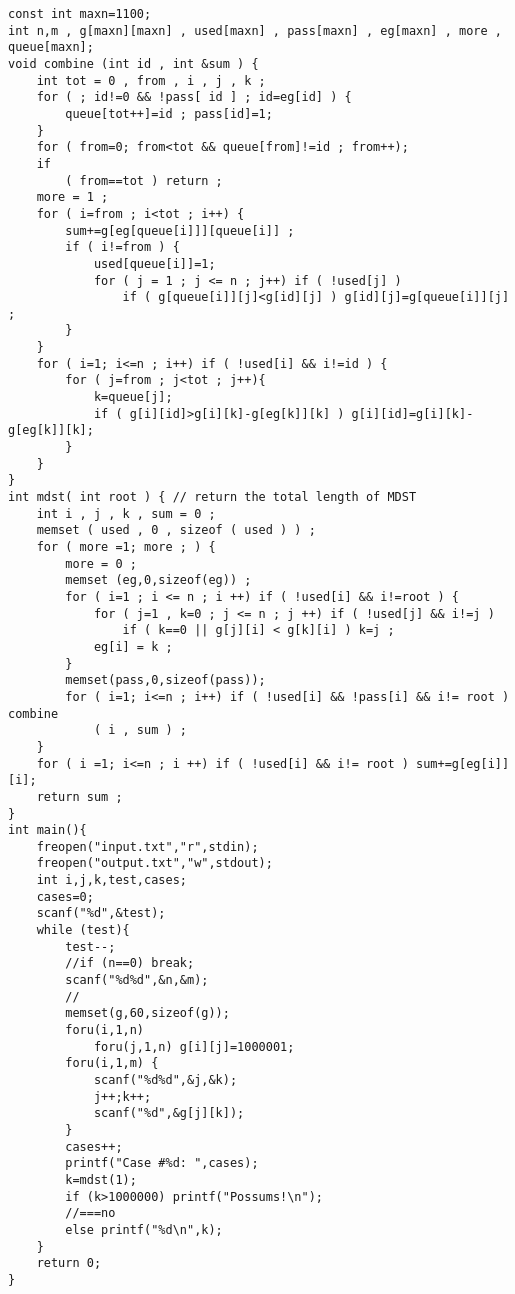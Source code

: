 \begin{lstlisting}
const int maxn=1100;
int n,m , g[maxn][maxn] , used[maxn] , pass[maxn] , eg[maxn] , more , queue[maxn];
void combine (int id , int &sum ) {
	int tot = 0 , from , i , j , k ;
	for ( ; id!=0 && !pass[ id ] ; id=eg[id] ) {
		queue[tot++]=id ; pass[id]=1;
	}
	for ( from=0; from<tot && queue[from]!=id ; from++);
	if
		( from==tot ) return ;
	more = 1 ;
	for ( i=from ; i<tot ; i++) {
		sum+=g[eg[queue[i]]][queue[i]] ;
		if ( i!=from ) {
			used[queue[i]]=1;
			for ( j = 1 ; j <= n ; j++) if ( !used[j] )
				if ( g[queue[i]][j]<g[id][j] ) g[id][j]=g[queue[i]][j] ;
		}
	}
	for ( i=1; i<=n ; i++) if ( !used[i] && i!=id ) {
		for ( j=from ; j<tot ; j++){
			k=queue[j];
			if ( g[i][id]>g[i][k]-g[eg[k]][k] ) g[i][id]=g[i][k]-g[eg[k]][k];
		}
	}
}
int mdst( int root ) { // return the total length of MDST
	int i , j , k , sum = 0 ;
	memset ( used , 0 , sizeof ( used ) ) ;
	for ( more =1; more ; ) {
		more = 0 ;
		memset (eg,0,sizeof(eg)) ;
		for ( i=1 ; i <= n ; i ++) if ( !used[i] && i!=root ) {
			for ( j=1 , k=0 ; j <= n ; j ++) if ( !used[j] && i!=j )
				if ( k==0 || g[j][i] < g[k][i] ) k=j ;
			eg[i] = k ;
		}
		memset(pass,0,sizeof(pass));
		for ( i=1; i<=n ; i++) if ( !used[i] && !pass[i] && i!= root ) combine
			( i , sum ) ;
	}
	for ( i =1; i<=n ; i ++) if ( !used[i] && i!= root ) sum+=g[eg[i]][i];
	return sum ;
}
int main(){
	freopen("input.txt","r",stdin);
	freopen("output.txt","w",stdout);
	int i,j,k,test,cases;
	cases=0;
	scanf("%d",&test);
	while (test){
		test--;
		//if (n==0) break;
		scanf("%d%d",&n,&m);
		//
		memset(g,60,sizeof(g));
		foru(i,1,n)
			foru(j,1,n) g[i][j]=1000001;
		foru(i,1,m) {
			scanf("%d%d",&j,&k);
			j++;k++;
			scanf("%d",&g[j][k]);
		}
		cases++;
		printf("Case #%d: ",cases);
		k=mdst(1);
		if (k>1000000) printf("Possums!\n");
		//===no
		else printf("%d\n",k);
	}
	return 0;
}
\end{lstlisting}
